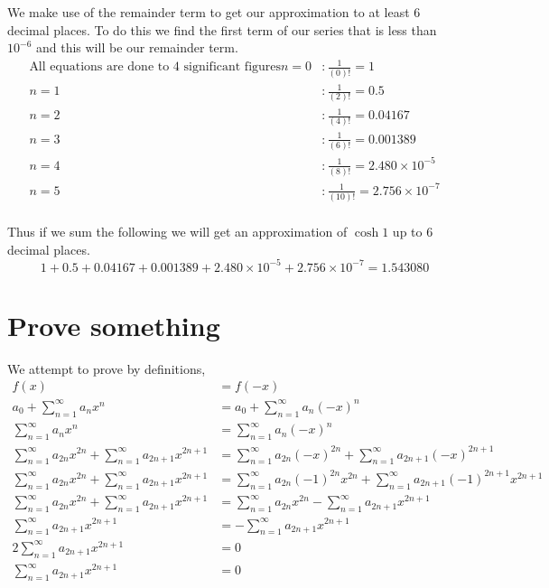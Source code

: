 \documentclass{article}
\begin{document}
We make use of the remainder term to get our approximation to at least
6 decimal places. To do this we find the first term of our series that is
less than $10^{-6}$ and this will be our remainder term.
\begin{align*}
    \text{All equations are done to 4 significant figures}
    n=0 &: \frac{1}{(0)!} = 1 \\
    n=1 &: \frac{1}{(2)!} = 0.5 \\
    n=2 &: \frac{1}{(4)!} = 0.04167 \\
    n=3 &: \frac{1}{(6)!} = 0.001389 \\
    n=4 &: \frac{1}{(8)!} = 2.480 \times 10^{-5} \\
    n=5 &: \frac{1}{(10)!} = 2.756 \times 10^{-7} \\
\end{align*}

Thus if we sum the following we will get an approximation of $\cosh 1$ up to
6 decimal places.
\[
    1 + 0.5 + 0.04167 + 0.001389 + 2.480 \times 10^{-5} + 2.756 \times 10^{-7} = 1.543080
\]

\section{Prove something}
We attempt to prove by definitions,
\begin{align*}
    f(x) &= f(-x) \\
    a_0 + \sum_{n=1}^\infty a_n x^n &= a_0 + \sum_{n=1}^\infty a_n (-x)^n \\
    \sum_{n=1}^\infty a_n x^n &= \sum_{n=1}^\infty a_n (-x)^n \\
    \sum_{n=1}^\infty a_{2n} x^{2n} + \sum_{n=1}^\infty a_{2n+1} x^{2n+1}
    &= \sum_{n=1}^\infty a_{2n} (-x)^{2n} + \sum_{n=1}^\infty a_{2n+1} (-x)^{2n+1} \\
    \sum_{n=1}^\infty a_{2n} x^{2n} + \sum_{n=1}^\infty a_{2n+1} x^{2n+1}
    &= \sum_{n=1}^\infty a_{2n} (-1)^{2n} x^{2n} + \sum_{n=1}^\infty a_{2n+1} (-1)^{2n+1} x^{2n+1} \\
    \sum_{n=1}^\infty a_{2n} x^{2n} + \sum_{n=1}^\infty a_{2n+1} x^{2n+1}
    &= \sum_{n=1}^\infty a_{2n} x^{2n} - \sum_{n=1}^\infty a_{2n+1} x^{2n+1} \\
    \sum_{n=1}^\infty a_{2n+1} x^{2n+1} &= - \sum_{n=1}^\infty a_{2n+1} x^{2n+1} \\
    2 \sum_{n=1}^\infty a_{2n+1} x^{2n+1} &= 0 \\
    \sum_{n=1}^\infty a_{2n+1} x^{2n+1} &= 0 \\
\end{align*}
\end{document}
